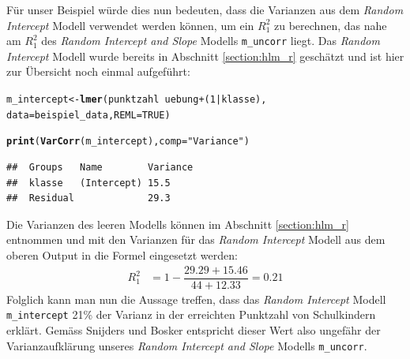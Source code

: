 \documentclass[12pt, a4paper]{article}\usepackage[]{graphicx}\usepackage[]{color}
\makeatletter
\newcommand{\hlnum}[1]{\textcolor[rgb]{0.686,0.059,0.569}{#1}}%
\newcommand{\hlstr}[1]{\textcolor[rgb]{0.192,0.494,0.8}{#1}}%
\newcommand{\hlopt}[1]{\textcolor[rgb]{0,0,0}{#1}}%
\newcommand{\hlstd}[1]{\textcolor[rgb]{0.345,0.345,0.345}{#1}}%
\newcommand{\hlkwb}[1]{\textcolor[rgb]{0.69,0.353,0.396}{#1}}%
\newcommand{\hlkwc}[1]{\textcolor[rgb]{0.333,0.667,0.333}{#1}}%
\newcommand{\hlkwd}[1]{\textcolor[rgb]{0.737,0.353,0.396}{\textbf{#1}}}%
\newenvironment{kframe}{%
 \def\at@end@of@kframe{}%
 \ifinner\ifhmode%
  \def\at@end@of@kframe{\end{minipage}}%
  \begin{minipage}{\columnwidth}%
 \fi\fi%
 \def\FrameCommand##1{\hskip\@totalleftmargin \hskip-\fboxsep
 \colorbox{shadecolor}{##1}\hskip-\fboxsep
     \hskip-\linewidth \hskip-\@totalleftmargin \hskip\columnwidth}%
 \MakeFramed {\advance\hsize-\width
   \@totalleftmargin\z@ \linewidth\hsize
   \@setminipage}}%
 {\par\unskip\endMakeFramed%
 \at@end@of@kframe}
\newenvironment{knitrout}{}{} %
\makeatother
\begin{document}
Für unser Beispiel würde dies nun bedeuten, dass die Varianzen aus dem \textit{Random Intercept} Modell verwendet werden können, um ein $R_{1}^2$ zu berechnen, das nahe am $R_{1}^2$ des \textit{Random Intercept and Slope} Modells \texttt{m\_uncorr} liegt. Das \textit{Random Intercept} Modell wurde bereits in Abschnitt \ref{section:hlm_r} geschätzt und ist hier zur Übersicht noch einmal aufgeführt:

\singlespacing
\begin{knitrout}
\color{fgcolor}\begin{kframe}
\begin{alltt}
\hlstd{m_intercept} \hlkwb{<-} \hlkwd{lmer}\hlstd{(punktzahl} \hlopt{~} \hlstd{uebung} \hlopt{+} \hlstd{(}\hlnum{1} \hlopt{|} \hlstd{klasse),}
                \hlkwc{data} \hlstd{= beispiel_data,} \hlkwc{REML} \hlstd{=} \hlnum{TRUE}\hlstd{)}

\hlkwd{print}\hlstd{(}\hlkwd{VarCorr}\hlstd{(m_intercept),} \hlkwc{comp} \hlstd{=} \hlstr{"Variance"}\hlstd{)}
\end{alltt}
\begin{verbatim}
##  Groups   Name        Variance
##  klasse   (Intercept) 15.5    
##  Residual             29.3
\end{verbatim}
\end{kframe}
\end{knitrout}



\newpage
Die Varianzen des leeren Modells können im Abschnitt \ref{section:hlm_r} entnommen und mit den Varianzen für das \textit{Random Intercept} Modell aus dem oberen Output in die Formel eingesetzt werden:
\begin{equation} 
\begin{split}	
 R_{1}^2 & = 1 - \dfrac{29.29 + 15.46}{44 + 12.33} = 0.21
\end{split}	
\end{equation}
Folglich kann man nun die Aussage treffen, dass das \textit{Random Intercept} Modell \texttt{m\_intercept} 21\% der Varianz in der erreichten Punktzahl von Schulkindern erklärt. Gemäss Snijders und Bosker \citeyearpar{SnijdersTomA.B2012Ma:a} entspricht dieser Wert also ungefähr der Varianzaufklärung unseres \textit{Random Intercept and Slope} Modells \texttt{m\_uncorr}. 
\end{document}

